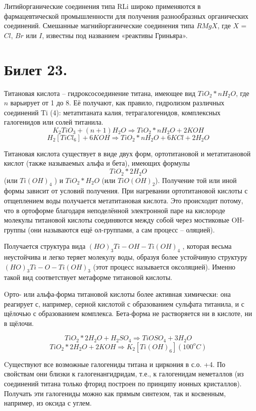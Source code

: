 \documentclass[11pt]{article}
\begin{document}
Литийорганические соединения типа RLi широко применяются в фармацевтической промышленности для
получения разнообразных органических соединений.
Смешанные магнийорганические соединения типа $RMgX$, где $X$ = $Cl$, $Br$ или $I$, известны под названием
«реактивы Гриньяра».


\section{Билет 23. }
Титановая кислота – гидроксосоединение титана, имеющее вид $TiO _2 *nH _2 O$, где $n$
варьирует от 1 до 8. Её получают, как правило, гидролизом различных соединений Ti (4):
метатитаната калия, тетрагалогенидов, комплексных галогенидов или солей титанила.
$$K_2 TiO_3 + (n + 1)H _2 O \Rightarrow TiO _2 *nH _2 O + 2KOH$$
$$H _2 [TiCl _6 ] + 6KOH \Rightarrow TiO _2 *nH _2 O + 6KCl + 2H _2 O$$

Титановая кислота существует в виде двух форм, ортотитановой и метатитановой кислот
(также называемых альфа и бета), имеющих формулы $$TiO _2 *2H _2 O$$ (или $Ti(OH) _4$ ) и $TiO _2 *H _2 O$
(или $TiO(OH)_2$).
 Получение той или иной формы зависит от условий получения. При
нагревании ортотитановой кислоты с отщеплением воды получается метатитановая
кислота. Это происходит потому, что в ортоформе благодаря неподелённой электронной
паре на кислороде молекулы титановой кислоты соединяются между собой через
мостиковые OH-группы (они называются ещё ол-группами, а сам процесс – оляцией).

Получается структура вида $(HO) _3 Ti-OH-Ti(OH) _4$ , которая весьма неустойчива и легко теряет
молекулу воды, образуя более устойчивую структуру $(HO) _3 Ti-O-Ti(OH) _3$ (этот процесс
называется оксоляцией). Именно такой вид соответствует метаформе титановой кислоты.

Oрто- или альфа-форма титановой кислоты более активная химически: она реагирует с,
например, серной кислотой с образованием сульфата титанила, и с щёлочью с
образованием комплекса. Бета-форма не растворяется ни в кислоте, ни в щёлочи.

$$TiO _2 *2H _2 O + H _2 SO _4 \Rightarrow TiOSO _4 + 3H _2 O$$
$$TiO _2 *2H _2 O + 2KOH \Rightarrow K _2 [Ti(OH) _6 ] (100 ^o C)$$

Cуществуют все возможные галогениды титана и циркония в с.о. +4. По свойствам они
близки к галогенангидридам, т.е., к галогенидам неметаллов (из соединений титана
только фторид построен по принципу ионных кристаллов). Получать эти галогениды
можно как прямым синтезом, так и косвенным, например, из оксида с углем.
\end{document}
